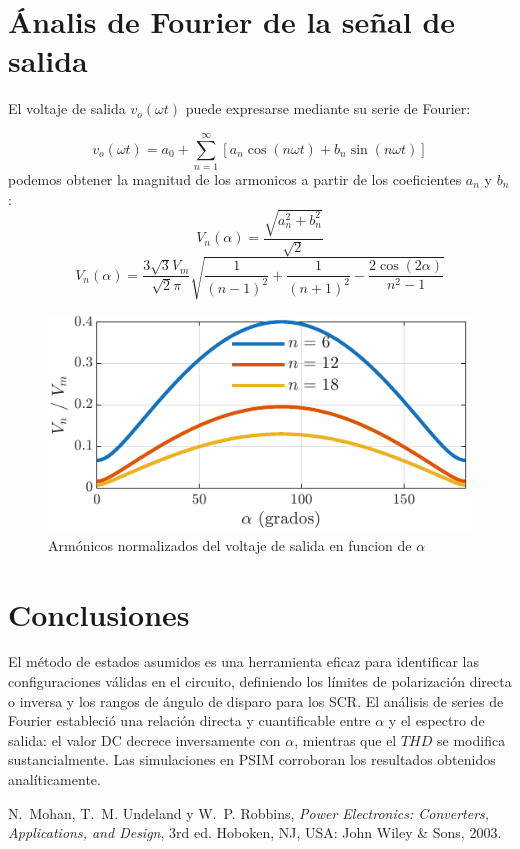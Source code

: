 \documentclass[conference]{IEEEtran}
\begin{document}
\section{Ánalis de Fourier de la señal de salida}
El voltaje de salida \(v_o(\omega t)\) puede expresarse mediante su serie de Fourier:

\[
v_o(\omega t) = a_0 + \sum_{n=1}^{\infty} \left[a_n \cos(n\omega t) + b_n \sin(n\omega t)\right]
\]
podemos obtener la magnitud de los armonicos a partir de los coeficientes \(a_n\) y \(b_n\): 
\[ V_{n}(\alpha)=\frac{\sqrt{a_n^2 + b_n^2}}{\sqrt{2}} \] \[ V_{n}(\alpha) = 
\frac{3\sqrt{3}V_m}{\sqrt{2}\pi} \sqrt{ \frac{1}{(n-1)^2} + \frac{1}{(n+1)^2} - \frac{2\cos(2\alpha)}{n^2-1} } \] 

\begin{figure}[ht]
	\centering
	\includegraphics[scale=1]{Fig/Armonicos.pdf}
	\caption{Armónicos normalizados del voltaje de salida en funcion de $\alpha$ }
	\label{fig:arm}
\end{figure}


\section{Conclusiones}
El método de estados asumidos es una herramienta eficaz para identificar las configuraciones válidas en el circuito, definiendo los límites de polarización directa o inversa
y los rangos de ángulo de disparo para los SCR. El análisis de series de Fourier estableció una relación directa y cuantificable entre $\alpha$ y el espectro de salida: el valor DC decrece inversamente con $\alpha$,
mientras que el $THD$ se modifica sustancialmente. Las simulaciones en PSIM corroboran los resultados obtenidos analíticamente.

\begin{thebibliography}{plain}
N.~Mohan, T.~M. Undeland y W.~P. Robbins,
\textit{Power Electronics: Converters, Applications, and Design},
3rd ed. Hoboken, NJ, USA: John Wiley \& Sons, 2003.
\end{thebibliography}
\end{document}
